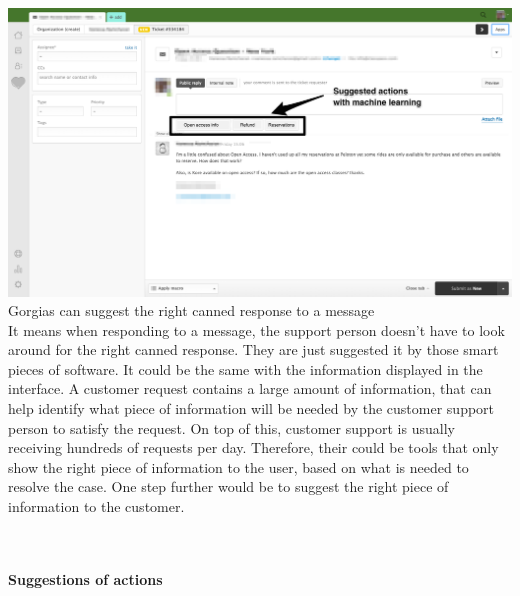 \documentclass[12pt]{article}
\begin{document}
\\
\includegraphics[width=\textwidth]{zendesk}
Gorgias can suggest the right canned response to a message
\\

It means when responding to a message, the support person doesn't have to look around for the right canned response. They are just suggested it by those smart pieces of software. 
It could be the same with the information displayed in the interface. A customer request contains a large amount of information, that can help identify what piece of information will be needed by the customer support person to satisfy the request. On top of this, customer support is usually receiving hundreds of requests per day. Therefore, their could be tools that only show the right piece of information to the user, based on what is needed to resolve the case. One step further would be to suggest the right piece of information to the customer. 

\\
\paragraph{Suggestions of actions}
\\
\end{document}

